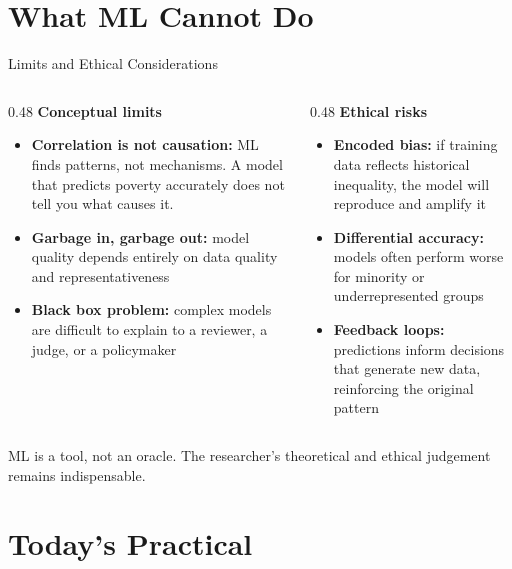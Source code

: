 \documentclass[aspectratio=169, 10pt]{beamer}
\begin{document}
\section{What ML Cannot Do}

\begin{frame}{Limits and Ethical Considerations}
\begin{columns}[T]
\begin{column}{0.48\textwidth}
\textbf{Conceptual limits}
\begin{itemize}
  \setlength\itemsep{0.4em}
  \item \textbf{Correlation is not causation:} ML finds patterns, not mechanisms. A model that predicts poverty accurately does not tell you what causes it.
  \item \textbf{Garbage in, garbage out:} model quality depends entirely on data quality and representativeness
  \item \textbf{Black box problem:} complex models are difficult to explain to a reviewer, a judge, or a policymaker
\end{itemize}
\end{column}
\begin{column}{0.48\textwidth}
\textbf{Ethical risks}
\begin{itemize}
  \setlength\itemsep{0.4em}
  \item \textbf{Encoded bias:} if training data reflects historical inequality, the model will reproduce and amplify it
  \item \textbf{Differential accuracy:} models often perform worse for minority or underrepresented groups
  \item \textbf{Feedback loops:} predictions inform decisions that generate new data, reinforcing the original pattern
\end{itemize}
\end{column}
\end{columns}

\vspace{0.9em}
\begin{center}
\alert{ML is a tool, not an oracle. The researcher's theoretical and ethical judgement remains indispensable.}
\end{center}
\end{frame}

\section{Today's Practical}
\end{document}
